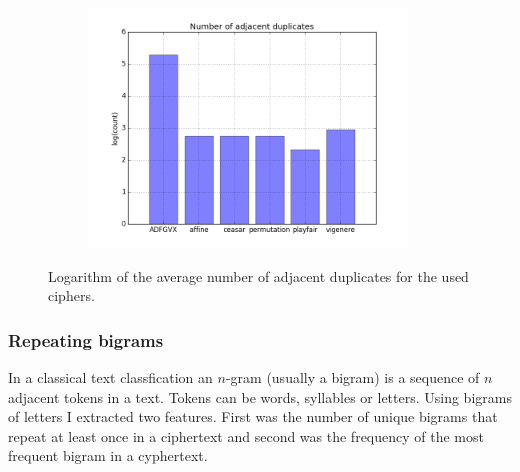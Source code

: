 \documentclass[a4paper]{article}
\begin{document}
\begin{figure}[H]
    \centering
    \begin{subfigure}[h]{0.5\textwidth}
        \centering
        \includegraphics[height=2.5in]{img/no_adj_dups_log.png}
    \end{subfigure}
    \caption{Logarithm of the average number of adjacent duplicates for the used ciphers.}
    \label{fig:adj_dups}
\end{figure}

\subsubsection*{Repeating bigrams}
In a classical text classfication an $n$-gram (usually a bigram) is a sequence of $n$ adjacent tokens in a text. Tokens can be words, syllables or letters. Using bigrams of letters I extracted two features. First was the number of unique bigrams that repeat at least once in a ciphertext and second was the frequency of the most frequent bigram in a cyphertext.
\end{document}

